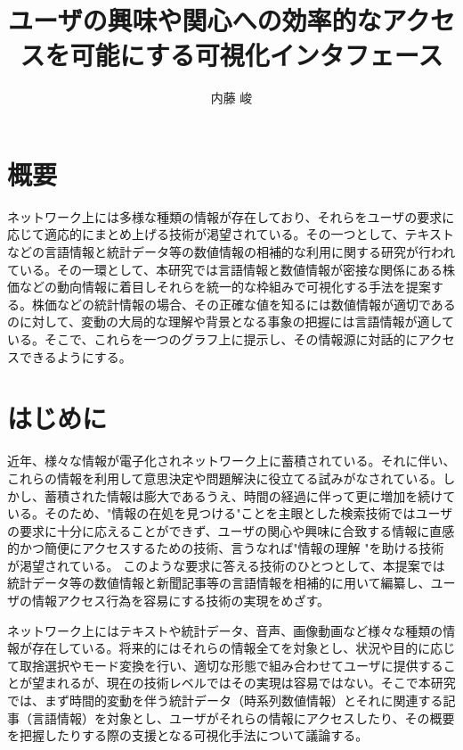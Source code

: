 \documentclass{matsushita-zemi}
\title{ユーザの興味や関心への効率的なアクセスを可能にする可視化インタフェース}
\author{内藤 峻}
\begin{document}
\maketitle

\section*{概要}
\label{abstract}
ネットワーク上には多様な種類の情報が存在しており、それらをユーザの要求に応じて適応的にまとめ上げる技術が渇望されている。その一つとして、テキストなどの言語情報と統計データ等の数値情報の相補的な利用に関する研究が行われている。その一環として、本研究では言語情報と数値情報が密接な関係にある株価などの動向情報に着目しそれらを統一的な枠組みで可視化する手法を提案する。株価などの統計情報の場合、その正確な値を知るには数値情報が適切であるのに対して、変動の大局的な理解や背景となる事象の把握には言語情報が適している。そこで、これらを一つのグラフ上に提示し、その情報源に対話的にアクセスできるようにする。

\section{はじめに}
\label{background}
近年、様々な情報が電子化されネットワーク上に蓄積されている。それに伴い、これらの情報を利用して意思決定や問題解決に役立てる試みがなされている。しかし、蓄積された情報は膨大であるうえ、時間の経過に伴って更に増加を続けている。そのため、"情報の在処を見つける"ことを主眼とした検索技術ではユーザの要求に十分に応えることができず、ユーザの関心や興味に合致する情報に直感的かつ簡便にアクセスするための技術、言うなれば"情報の理解   "を助ける技術が渇望されている\cite{Elucignage}。
このような要求に答える技術のひとつとして、本提案では統計データ等の数値情報と新聞記事等の言語情報を相補的に用いて編纂し、ユーザの情報アクセス行為を容易にする技術の実現をめざす\cite{information_compilation}。

ネットワーク上にはテキストや統計データ、音声、画像動画など様々な種類の情報が存在している。将来的にはそれらの情報全てを対象とし、状況や目的に応じて取捨選択やモード変換を行い、適切な形態で組み合わせてユーザに提供することが望まれるが、現在の技術レベルではその実現は容易ではない。そこで本研究では、まず時間的変動を伴う統計データ（時系列数値情報）とそれに関連する記事（言語情報）を対象とし、ユーザがそれらの情報にアクセスしたり、その概要を把握したりする際の支援となる可視化手法について議論する\cite{Elucignage-jsai}。
\end{document}
